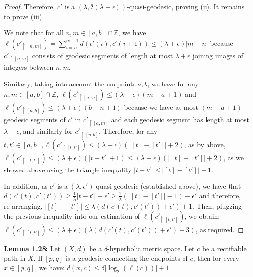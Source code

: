 \documentclass[12pt]{article}
\newcommand{\vs}{\vskip10pt}
\begin{document}
\begin{proof}
		\vs
		
		Therefore, $c'$ is a $(\lambda, 2(\lambda + \epsilon))$-quasi-geodesic, proving (ii). It remains to prove (iii). 
		
		\vs 
		
		We note that for all $n,m \in [a,b] \cap \mathbb{Z}$, we have $\ell(c'_{\restriction [n,m]}) = \sum_{i=n}^{m-1} d(c'(i), c'(i+1)) \leq (\lambda + \epsilon) \vert m - n \vert$ because $c'_{\restriction [n,m]}$ consists of geodesic segments of length at most $\lambda + \epsilon$ joining images of integers between $n,m$. 
		
		\vs 
		
		Similarly, taking into account the endpoints $a,b$, we have for any $n,m \in [a,b] \cap \mathbb{Z}$, $\ell(c'_{\restriction [a,m]}) \leq (\lambda + \epsilon)(m-a+1)$ and $\ell(c'_{\restriction [n,b]}) \leq (\lambda + \epsilon)(b- n +1)$ because we have at most $(m - a + 1)$ geodesic segments of $c'$ in $c'_{\restriction [a,m]}$ and each geodesic segment has length at most $\lambda + \epsilon$, and similarly for $c'_{\restriction [n,b]}$. Therefore, for any $t, t' \in [a,b], \ell(c'_{\restriction [t, t']}) \leq (\lambda + \epsilon)(\vert [t] - [t'] \vert + 2)$, as by above, $\ell(c'_{\restriction [t, t']}) \leq (\lambda + \epsilon) (\vert t - t' \vert + 1) \leq (\lambda + \epsilon) (\vert [t] - [t'] \vert + 2)$, as we showed above using the triangle inequality $\vert t - t' \vert \leq \vert [t] - [t'] \vert + 1$. 
		
		\vs 
		
	In addition, as $c'$ is a $(\lambda, \epsilon')$-quasi-geodesic (established above), we have that $d(c'(t), c'(t')) \geq \frac{1}{\lambda} \vert t - t' \vert - \epsilon' \geq \frac{1}{\lambda} (\vert [t] - [t'] \vert -1) - \epsilon'$ and therefore, re-arranging, $\vert [t] - [t'] \vert \leq \lambda(d(c'(t), c'(t')) + \epsilon') + 1$. Then, plugging the previous inequality into our estimation of $\ell(c'_{\restriction [t, t']})$, we obtain: $\ell(c'_{\restriction [t, t']}) \leq (\lambda + \epsilon)(\lambda(d(c'(t), c'(t')) + \epsilon') + 3)$, as required. 
		
	\end{proof}
	
	\vs 
	
	\textbf{Lemma 1.28: } Let $(X,d)$ be a $\delta$-hyperbolic metric space. Let $c$ be a rectifiable path in $X$. If $[p,q]$ is a geodesic connecting the endpoints of $c$, then for every $x \in [p,q]$, we have: $d(x,c) \leq \delta \vert \log_2( \ell(c)) \vert + 1$. 
	
\end{document}
